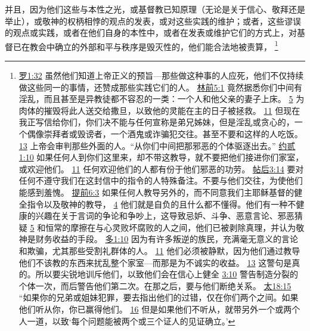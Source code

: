 \documentclass[12pt, a4paper, oneside]{ctexart}
\begin{document}
	并且，因为他们这些与本性之光，或基督教已知原理（无论是关于信心、敬拜还是举止），或敬神的权柄相悖的观点的发表，或对这些实践的维护；或者，这些谬误的观点或实践，或者在他们自身的本性中，或者在发表或维护它们的方式上，对基督已在教会中确立的外部和平与秩序是毁灭性的，他们能合法地被责算，
	\footnote {
		\href{https://biblehub.com/romans/1-32.htm}{罗1:32} 虽然他们知道上帝正义的预旨---那些做这种事的人应死，他们不仅持续做这些同一的事情，还赞成那些实践它们的人。
		\href{https://biblehub.com/1_corinthians/5-1.htm}{林前5:1} 竟然据悉你们中间有淫乱，而且甚至是异教徒都不容忍的一类：一个人和他父亲的妻子上床。
		\href{https://biblehub.com/1_corinthians/5-5.htm}{5} 为肉体的摧毁将此人送交给撒旦，以致他的灵能在主的日子被拯救。
		\href{https://biblehub.com/1_corinthians/5-11.htm}{11} 但现在我正写信给你们，你们决不能与任何宣称是弟兄姊妹，但是淫乱或贪心的，一个偶像崇拜者或毁谤者，一个酒鬼或诈骗犯交往。甚至不要和这样的人吃饭。
		\href{https://biblehub.com/1_corinthians/5-13.htm}{13} 上帝会审判那些外面的人。“从你们中间把那邪恶的个体驱逐出去。”
		\href{https://biblehub.com/2_john/1-10.htm}{约贰1:10} 如果任何人到你们这里来，却不带这教导，就不要把他们接进你们家室，或欢迎他们。
		\href{https://biblehub.com/2_john/1-11.htm}{11} 任何欢迎他们的人都有份于他们邪恶的功劳。
		\href{https://biblehub.com/2_thessalonians/3-14.htm}{帖后3:14} 要对任何不遵守我们在这封信中的指令的人特殊备注。不要与他们交往，为使他们能感到羞愧。
		\href{https://biblehub.com/1_timothy/6-3.htm}{提前6:3} 如果任何人教导另外的，而不同意我们主耶稣基督的健全指令以及敬神的教导，
		\href{https://biblehub.com/1_timothy/6-4.htm}{4} 他们就是自负的且什么都不懂得。他们有一种不健康的兴趣在关于言词的争论和争吵上，这导致忌妒、斗争、恶意言论、邪恶猜疑
		\href{https://biblehub.com/1_timothy/6-5.htm}{5} 和恒常的摩擦在与心灵败坏腐败的人之间，他们已被剥除真理，并认为敬神是财务收益的手段。
		\href{https://biblehub.com/titus/1-10.htm}{多1:10} 因为有许多叛逆的族民，充满毫无意义的言论和欺骗，尤其那些受割礼群体的人。
		\href{https://biblehub.com/titus/1-11.htm}{11} 他们必须被静默，因为他们通过教导他们不该教的东西来扰乱整个家室---而那是为不诚实的收益。
		\href{https://biblehub.com/titus/1-13.htm}{13} 这警句是真的。所以要尖锐地训斥他们，以致他们会在信心上健全
		\href{https://biblehub.com/titus/3-10.htm}{3:10} 警告制造分裂的个体一次，而后警告他们第二次。在那之后，要与他们断绝关系。
		\href{https://biblehub.com/matthew/18-15.htm}{太18:15} “如果你的兄弟或姐妹犯罪，要去指出他们的过错，仅在你们两个之间。如果他们听从你，你已赢得他们。
		\href{https://biblehub.com/matthew/18-16.htm}{16} 但是如果他们不听从，就带另外一个或两个人一道，以致‘每个问题能被两个或三个证人的见证确立。’
}
\end{document}
